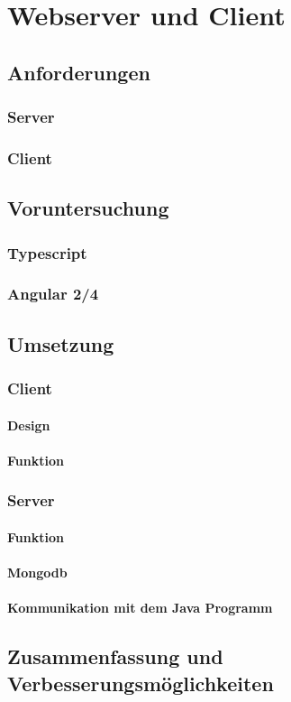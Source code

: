 \chapter{Webserver und Client}
\label{sec:webserver-und-client}

\section{Anforderungen}

\subsection{Server}

\subsection{Client}

\section{Voruntersuchung}

\subsection{Typescript}

\subsection{Angular 2/4}

\section{Umsetzung}

\subsection{Client}

\subsubsection{Design}

\subsubsection{Funktion}

\subsection{Server}

\subsubsection{Funktion}

\subsubsection{Mongodb}

\subsubsection{Kommunikation mit dem Java Programm}

\section{Zusammenfassung und Verbesserungsmöglichkeiten}